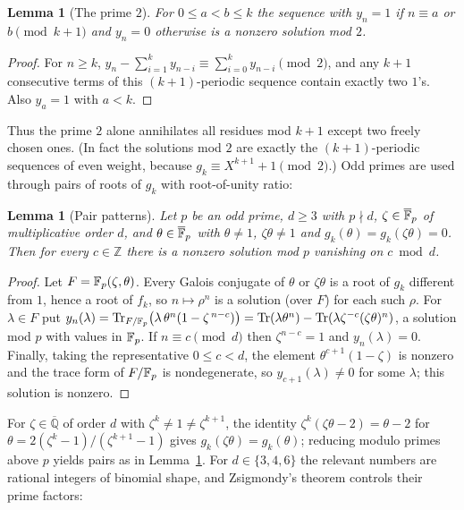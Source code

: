\documentclass[11pt]{amsart}
\newtheorem{lemma}[theorem]{Lemma}
\theoremstyle{definition}
\theoremstyle{remark}
\providecommand{\Q}{\mathbb Q}
\providecommand{\Z}{\mathbb Z}
\begin{document}
\begin{lemma}[The prime $2$]\label{R6:lem:two}
For $0\le a<b\le k$ the sequence with $y_n=1$ if $n\equiv a$ or $b\pmod{k+1}$ and $y_n=0$
otherwise is a nonzero solution mod $2$.
\end{lemma}
\begin{proof}
For $n\ge k$, $y_n-\sum_{i=1}^ky_{n-i}\equiv\sum_{i=0}^{k}y_{n-i}\pmod 2$, and any $k+1$ consecutive
terms of this $(k+1)$-periodic sequence contain exactly two $1$'s. Also $y_a=1$ with $a<k$.
\end{proof}

Thus the prime $2$ alone annihilates all residues mod $k+1$ except two freely chosen ones. (In fact the
solutions mod $2$ are exactly the $(k+1)$-periodic sequences of even weight, because
$g_k\equiv X^{k+1}+1\pmod 2$.) Odd primes are used through pairs of roots of $g_k$ with
root-of-unity ratio:

\begin{lemma}[Pair patterns]\label{R6:lem:pair}
Let $p$ be an odd prime, $d\ge3$ with $p\nmid d$, $\zeta\in\overline{\mathbb{F}}_p$ of multiplicative order
$d$, and $\theta\in\overline{\mathbb{F}}_p$ with $\theta\ne1$, $\zeta\theta\ne1$ and
$g_k(\theta)=g_k(\zeta\theta)=0$. Then for every $c\in\Z$ there is a nonzero solution mod $p$
vanishing on $c\bmod d$.
\end{lemma}
\begin{proof}
Let $F=\mathbb{F}_p(\zeta,\theta)$. Every Galois conjugate of $\theta$ or $\zeta\theta$ is a root of $g_k$
different from $1$, hence a root of $f_k$, so $n\mapsto\rho^n$ is a solution (over $F$) for each such
$\rho$. For $\lambda\in F$ put
$y_n(\lambda)=\operatorname{Tr}_{F/\mathbb{F}_p}\bigl(\lambda\,\theta^n(1-\zeta^{\,n-c})\bigr)
=\operatorname{Tr}(\lambda\theta^n)-\operatorname{Tr}(\lambda\zeta^{-c}(\zeta\theta)^n)$, a solution mod $p$ with values in
$\mathbb{F}_p$. If $n\equiv c\pmod d$ then $\zeta^{n-c}=1$ and $y_n(\lambda)=0$. Finally, taking the representative $0\le c<d$, the element
$\theta^{c+1}(1-\zeta)$ is nonzero and the trace form of $F/\mathbb{F}_p$ is nondegenerate, so
$y_{c+1}(\lambda)\neq0$ for some $\lambda$; this solution is nonzero.
\end{proof}

For $\zeta\in\overline{\Q}$ of order $d$ with $\zeta^k\ne1\ne\zeta^{k+1}$, the identity
$\zeta^k(\zeta\theta-2)=\theta-2$ for $\theta=2(\zeta^k-1)/(\zeta^{k+1}-1)$ gives
$g_k(\zeta\theta)=g_k(\theta)$; reducing modulo primes above $p$ yields pairs as in
Lemma~\ref{R6:lem:pair}. For $d\in\{3,4,6\}$ the relevant numbers are rational integers of binomial
shape, and Zsigmondy's theorem controls their prime factors:
\end{document}
